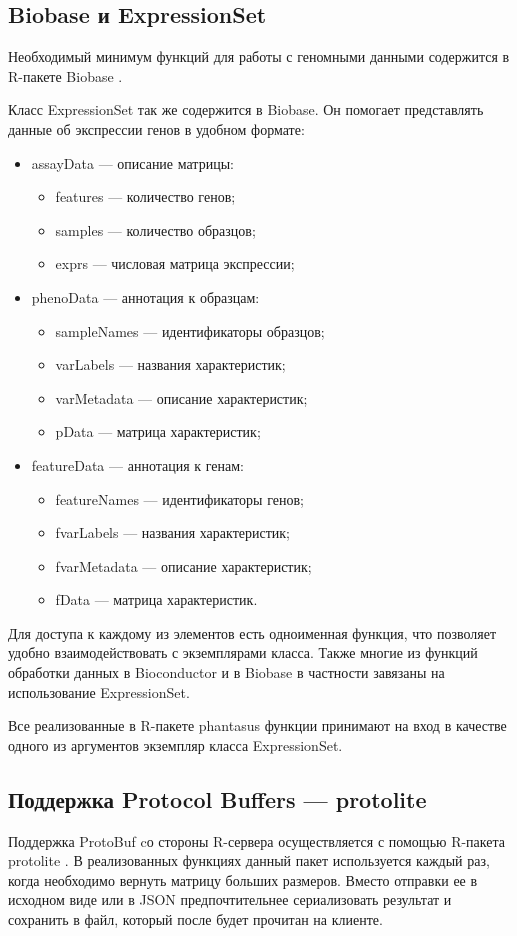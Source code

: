 \documentclass[annotation,specification]{itmo-student-thesis}
\begin{document}
\subsection{Biobase и ExpressionSet}
Необходимый минимум функций для работы с геномными данными содержится в R-пакете Biobase \cite{biobase}.

Класс ExpressionSet \cite{expressionset} так же содержится в Biobase. Он помогает представлять данные об экспрессии генов в удобном формате:
\begin{itemize}
\item assayData --- описание матрицы:\begin{itemize}
\item features --- количество генов;
\item samples --- количество образцов;
\item exprs --- числовая матрица экспрессии; \end{itemize}
\item phenoData --- аннотация к образцам:\begin{itemize}
\item sampleNames --- идентификаторы образцов;
\item varLabels --- названия характеристик;
\item varMetadata --- описание характеристик;
\item pData --- матрица характеристик;\end{itemize}
\item featureData --- аннотация к генам:\begin{itemize}
\item featureNames --- идентификаторы генов;
\item fvarLabels --- названия характеристик;
\item fvarMetadata --- описание характеристик;
\item fData --- матрица характеристик.\end{itemize}
\end{itemize}

Для доступа к каждому из элементов есть одноименная функция, что позволяет удобно взаимодействовать с экземплярами класса. Также многие из функций обработки данных в Bioconductor и в Biobase в частности завязаны на использование ExpressionSet.

Все реализованные в R-пакете phantasus функции принимают на вход в качестве одного из аргументов экземпляр класса ExpressionSet.

\subsection{Поддержка Protocol Buffers --- protolite}
Поддержка ProtoBuf cо стороны R-сервера осуществляется с помощью R-пакета protolite \cite{protolite}. В реализованных функциях данный пакет используется каждый раз, когда необходимо вернуть матрицу больших размеров. Вместо отправки ее в исходном виде или в JSON предпочтительнее сериализовать результат и сохранить в файл, который после будет прочитан на клиенте.
\end{document}
